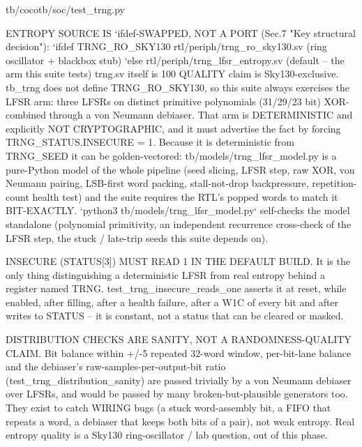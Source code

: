 \begin{relocated}{tb/cocotb/soc/test_trng.py}
\begin{textblock}
ENTROPY SOURCE IS `ifdef-SWAPPED, NOT A PORT (Sec.7 "Key structural decision"):
`ifdef TRNG_RO_SKY130   rtl/periph/trng_ro_sky130.sv    (ring oscillator + blackbox stub)
`else                   rtl/periph/trng_lfsr_entropy.sv (default -- the arm this suite tests)
trng.sv itself is 100 %
QUALITY claim is Sky130-exclusive. tb_trng does not define TRNG_RO_SKY130, so this suite always
exercises the LFSR arm: three LFSRs on distinct primitive polynomials (31/29/23 bit) XOR-combined
through a von Neumann debiaser. That arm is DETERMINISTIC and explicitly NOT CRYPTOGRAPHIC, and it
must advertise the fact by forcing TRNG_STATUS.INSECURE = 1. Because it is deterministic from
TRNG_SEED it can be golden-vectored: tb/models/trng_lfsr_model.py is a pure-Python model of the
whole pipeline (seed slicing, LFSR step, raw XOR, von Neumann pairing, LSB-first word packing,
stall-not-drop backpressure, repetition-count health test) and the suite requires the RTL's popped
words to match it BIT-EXACTLY. `python3 tb/models/trng_lfsr_model.py` self-checks the model
standalone (polynomial primitivity, an independent recurrence cross-check of the LFSR step, the
stuck / late-trip seeds this suite depends on).

INSECURE (STATUS[3]) MUST READ 1 IN THE DEFAULT BUILD. It is the only thing distinguishing a
deterministic LFSR from real entropy behind a register named TRNG. test_trng_insecure_reads_one
asserts it at reset, while enabled, after filling, after a health failure, after a W1C of every bit
and after writes to STATUS -- it is constant, not a status that can be cleared or masked.

DISTRIBUTION CHECKS ARE SANITY, NOT A RANDOMNESS-QUALITY CLAIM. Bit balance within +/-5 %
repeated 32-word window, per-bit-lane balance and the debiaser's raw-samples-per-output-bit ratio
(test_trng_distribution_sanity) are passed trivially by a von Neumann debiaser over LFSRs, and
would be passed by many broken-but-plausible generators too. They exist to catch WIRING bugs (a
stuck word-assembly bit, a FIFO that repeats a word, a debiaser that keeps both bits of a pair), not
weak entropy. Real entropy quality is a Sky130 ring-oscillator / lab question, out of this phase.


\end{textblock}
\end{relocated}
